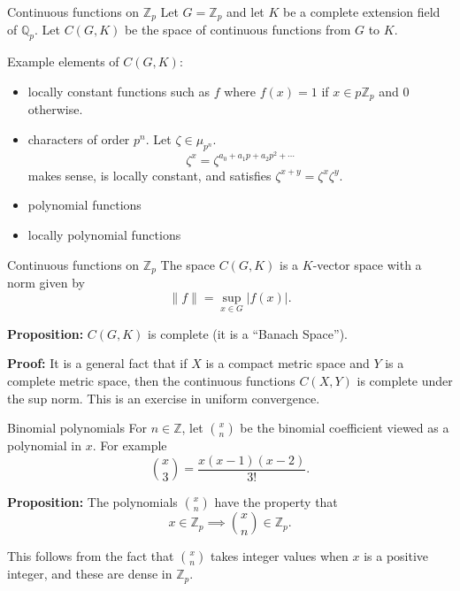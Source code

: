 \documentclass[
  ignorenonframetext,
]{beamer}
\providecommand{\tightlist}{%
  \setlength{\itemsep}{0pt}\setlength{\parskip}{0pt}}
\begin{document}
\begin{frame}{Continuous functions on \(\mathbb{Z}_p\)}
\protect\hypertarget{continuous-functions-on-mathbbz_p}{}
Let \(G=\mathbb{Z}_p\) and let \(K\) be a complete extension field of
\(\mathbb{Q}_p\). Let \(C(G,K)\) be the space of continuous functions
from \(G\) to \(K\).

Example elements of \(C(G,K)\):

\begin{itemize}
\tightlist
\item
  locally constant functions such as \(f\) where \(f(x)=1\) if
  \(x \in p\mathbb{Z}_p\) and \(0\) otherwise.
\item
  characters of order \(p^{n}\). Let \(\zeta\in\mu_{p^{n}}\).\\
  \[
  \zeta^{x}=\zeta^{a_0+a_1p+a_2p^2+\cdots}
  \] makes sense, is locally constant, and satisfies
  \(\zeta^{x+y}=\zeta^{x}\zeta^{y}.\)
\item
  polynomial functions
\item
  locally polynomial functions
\end{itemize}
\end{frame}

\begin{frame}{Continuous functions on \(\mathbb{Z}_p\)}
\protect\hypertarget{continuous-functions-on-mathbbz_p-1}{}
The space \(C(G,K)\) is a \(K\)-vector space with a norm given by \[
\|f\|=\sup_{x\in G} |f(x)|.
\]

\textbf{Proposition:} \(C(G,K)\) is complete (it is a ``Banach Space'').

\textbf{Proof:} It is a general fact that if \(X\) is a compact metric
space and \(Y\) is a complete metric space, then the continuous
functions \(C(X,Y)\) is complete under the sup norm. This is an exercise
in uniform convergence.
\end{frame}

\begin{frame}{Binomial polynomials}
\protect\hypertarget{binomial-polynomials}{}
For \(n\in \mathbb{Z}\), let \(\binom{x}{n}\) be the binomial
coefficient viewed as a polynomial in \(x\). For example \[
\binom{x}{3}=\frac{x(x-1)(x-2)}{3!}.
\]

\textbf{Proposition:} The polynomials \(\binom{x}{n}\) have the property
that \[
x\in\mathbb{Z}_p\implies \binom{x}{n}\in\mathbb{Z}_p.
\]

This follows from the fact that \(\binom{x}{n}\) takes integer values
when \(x\) is a positive integer, and these are dense in
\(\mathbb{Z}_p\).
\end{frame}
\end{document}
